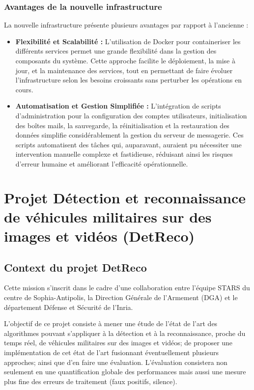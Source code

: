 \subsubsection{Avantages de la nouvelle infrastructure}

La nouvelle infrastructure présente plusieurs avantages par rapport à l'ancienne :

\begin{itemize}
	\item \textbf{Flexibilité et Scalabilité :} L'utilisation de Docker pour containeriser les différents services permet une grande flexibilité dans la gestion des composants du système. Cette approche facilite le déploiement, la mise à jour, et la maintenance des services, tout en permettant de faire évoluer l'infrastructure selon les besoins croissants sans perturber les opérations en cours.
	\item \textbf{Automatisation et Gestion Simplifiée :} L'intégration de scripts d'administration pour la configuration des comptes utilisateurs, initialisation des boîtes mails, la sauvegarde, la réinitialisation et la restauration des données simplifie considérablement la gestion du serveur de messagerie. Ces scripts automatisent des tâches qui, auparavant, auraient pu nécessiter une intervention manuelle complexe et fastidieuse, réduisant ainsi les risques d'erreur humaine et améliorant l'efficacité opérationnelle.
\end{itemize}




\section{Projet Détection et reconnaissance de véhicules militaires sur des images et vidéos (DetReco)}

\subsection{Context du projet DetReco}

Cette mission s’inscrit dans le cadre d’une collaboration entre l’équipe STARS du centre de Sophia-Antipolis, la Direction Générale de l’Armement (DGA) et le département Défense et Sécurité de l’Inria.

L'objectif de ce projet consiste à mener une étude de l’état de l’art des algorithmes pouvant s’appliquer à la détection et à la reconnaissance, proche du temps réel, de véhicules militaires sur des images et vidéos; de proposer une implémentation de cet état de l’art fusionnant éventuellement plusieurs approches; ainsi que d’en faire une évaluation.
L’évaluation consistera non seulement en une quantification globale des performances mais aussi une mesure plus fine des erreurs de traitement (faux positifs, silence).



